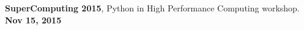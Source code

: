 \documentclass[margin,line]{resume}
\begin{document}
\begin{resume}
      \textbf{SuperComputing 2015}, Python in High Performance Computing workshop.     \hfill\textbf{Nov 15, 2015}\\

\end{resume}
\end{document}
